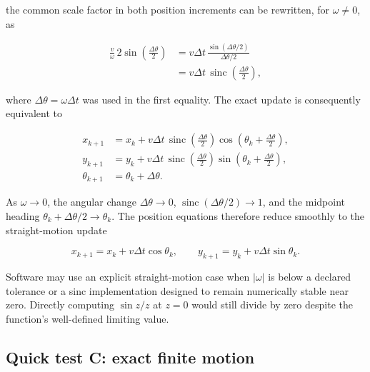 \documentclass[
  australian,
  12pt,
  letterpaper,
  DIV=11,
  numbers=noendperiod,
  twoside]{scrreprt}
\begin{document}
the common scale factor in both position increments can be rewritten,
for \(\omega\neq0\), as

\[
\begin{aligned}
\frac{v}{\omega}\,2\sin\left(\frac{\Delta\theta}{2}\right)
&=
v\Delta t\,
\frac{\sin(\Delta\theta/2)}{\Delta\theta/2}\\
&=
v\Delta t\,
\operatorname{sinc}\left(\frac{\Delta\theta}{2}\right),
\end{aligned}
\]

where \(\Delta\theta=\omega\Delta t\) was used in the first equality.
The exact update is consequently equivalent to

\[
\boxed{
\begin{aligned}
x_{k+1}
&=
x_k+
v\Delta t\,
\operatorname{sinc}\left(\frac{\Delta\theta}{2}\right)
\cos\left(\theta_k+\frac{\Delta\theta}{2}\right),\\
y_{k+1}
&=
y_k+
v\Delta t\,
\operatorname{sinc}\left(\frac{\Delta\theta}{2}\right)
\sin\left(\theta_k+\frac{\Delta\theta}{2}\right),\\
\theta_{k+1}
&=
\theta_k+\Delta\theta.
\end{aligned}
}
\]

As \(\omega\to0\), the angular change \(\Delta\theta\to0\),
\(\operatorname{sinc}(\Delta\theta/2)\to1\), and the midpoint heading
\(\theta_k+\Delta\theta/2\to\theta_k\). The position equations therefore
reduce smoothly to the straight-motion update

\[
x_{k+1}=x_k+v\Delta t\cos\theta_k,
\qquad
y_{k+1}=y_k+v\Delta t\sin\theta_k.
\]

Software may use an explicit straight-motion case when \(|\omega|\) is
below a declared tolerance or a sinc implementation designed to remain
numerically stable near zero. Directly computing \(\sin z/z\) at \(z=0\)
would still divide by zero despite the function's well-defined limiting
value.

\subsection*{Quick test C: exact finite
motion}\label{quick-test-c-exact-finite-motion}
\end{document}
